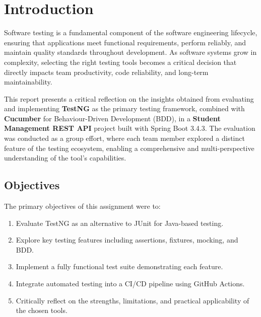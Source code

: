 \documentclass[12pt,a4paper]{article}
\begin{document}
\tableofcontents
\newpage

\section{Introduction}

Software testing is a fundamental component of the software engineering lifecycle, ensuring that applications meet functional requirements, perform reliably, and maintain quality standards throughout development. As software systems grow in complexity, selecting the right testing tools becomes a critical decision that directly impacts team productivity, code reliability, and long-term maintainability.

This report presents a critical reflection on the insights obtained from evaluating and implementing \textbf{TestNG} as the primary testing framework, combined with \textbf{Cucumber} for Behaviour-Driven Development (BDD), in a \textbf{Student Management REST API} project built with Spring Boot 3.4.3. The evaluation was conducted as a group effort, where each team member explored a distinct feature of the testing ecosystem, enabling a comprehensive and multi-perspective understanding of the tool's capabilities.

\subsection{Objectives}

The primary objectives of this assignment were to:

\begin{enumerate}
    \item Evaluate TestNG as an alternative to JUnit for Java-based testing.
    \item Explore key testing features including assertions, fixtures, mocking, and BDD.
    \item Implement a fully functional test suite demonstrating each feature.
    \item Integrate automated testing into a CI/CD pipeline using GitHub Actions.
    \item Critically reflect on the strengths, limitations, and practical applicability of the chosen tools.
\end{enumerate}
\end{document}
